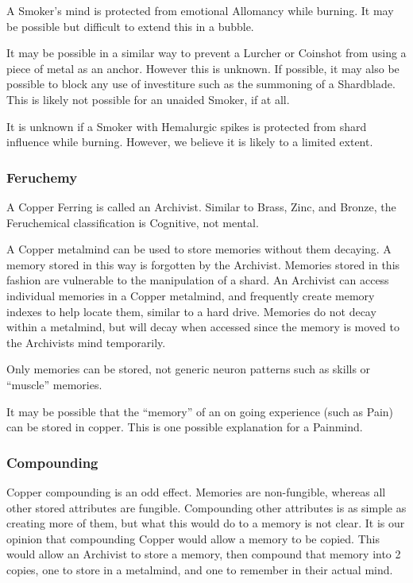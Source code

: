 \documentclass[conference]{IEEEtran}
\begin{document}
A Smoker's mind is protected from emotional Allomancy while burning.\cite{TFE-CH7}  It may be possible but difficult to extend this in a bubble.\cite{emo-cloud}

It may be possible in a similar way to prevent a Lurcher or Coinshot from using a piece of metal as an anchor.  However this is unknown.  If possible, it may also be possible to block any use of investiture such as the summoning of a Shardblade.\cite{rythm-block}\cite{emo-cloud}\cite{ARS} This is likely not possible for an unaided Smoker, if at all.

It is unknown if a Smoker with Hemalurgic spikes is protected from shard influence while burning.  However, we believe it is likely to a limited extent.\\
\subsubsection*{\textbf{Feruchemy}}
A Copper Ferring is called an Archivist.\cite{ARS}  Similar to Brass, Zinc, and Bronze, the Feruchemical classification is Cognitive, not mental.\cite{FE-TB} 

A Copper metalmind can be used to store memories without them decaying.  A memory stored in this way is forgotten by the Archivist.\cite{ARS}  Memories stored in this fashion are vulnerable to the manipulation of a shard.\cite{WoA-EP}  An Archivist can access individual memories in a Copper metalmind,\cite{copper-ia} and frequently create memory indexes\cite{WoA-CH4} to help locate them, similar to a hard drive.
Memories do not decay within a metalmind, but will decay when accessed since the memory is moved to the Archivists mind temporarily.\cite{WoA-CH15}

Only memories can be stored, not generic neuron patterns such as skills or ``muscle'' memories.\cite{copper-no-mm}

It may be possible that the ``memory'' of an on going experience (such as Pain) can be stored in copper.  This is one possible explanation for a Painmind.\cite{TLM-CH34}\\
\newpage
\subsubsection*{\textbf{Compounding}}
Copper compounding is an odd effect.  Memories are non-fungible, whereas all other stored attributes are fungible.  Compounding other attributes is as simple as creating more of them, but what this would do to a memory is not clear.  It is our opinion that compounding Copper would allow a memory to be copied.  This would allow an Archivist to store a memory, then compound that memory into 2 copies, one to store in a metalmind, and one to remember in their actual mind.\\
\end{document}
